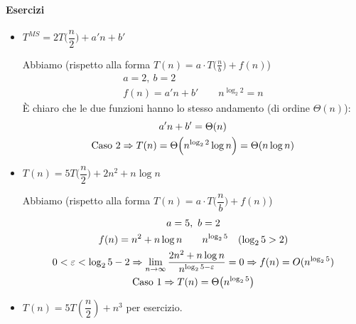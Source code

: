 \paragraph{Esercizi}
\begin{itemize}[label=$\bullet$]
    \item $T^{MS} = 2T\big(\dfrac{n}{2}\big) + a'n + b'$ \par
    Abbiamo (rispetto alla forma $T(n) = a \cdot T\big(\frac{n}{b}\big) + f(n)$)
    \begin{gather*}
        a = 2, \ b = 2 \\
        f(n) = a'n + b' \qquad n^{\log_2 2} = n
    \end{gather*}
    È chiaro che le due funzioni hanno lo stesso andamento (di ordine $\Theta(n)$):
    \begin{gather*}
        a'n + b' = \Theta (n) \\
        \text{\emph{Caso 2}} \Rightarrow T(n) = \Theta \Big(n^{\log_2 2} \log n \Big) = \Theta (n \log n)
    \end{gather*}

    \item $T(n) = 5T\big( \dfrac{n}{2} \big) + 2n^2 + n \log n$ \par
    Abbiamo (rispetto alla forma $T(n) = a \cdot T\big(\dfrac{n}{b}\big) + f(n)$)
    \begin{gather*}
        a = 5, \ b = 2 \\
        f(n) = n^2 + n \log n \qquad n^{\log_2 5} \quad (\log_2 5 > 2) \\
        0 < \varepsilon < \log_2 5 - 2 \Rightarrow 
            \lim_{n \to \infty} \frac{2n^2 + n \log n}{n^{\log_2 5 - \varepsilon}} = 0 
            \Rightarrow f(n) = O(n^{\log_2 5}) \\
        \text{\emph{Caso 1}} \Rightarrow T(n) = \Theta \big( n^{\log_2 5} \big)
    \end{gather*}

    \item $T(n) = 5T(\dfrac{n}{2}) + n^3$ per esercizio.


\end{itemize}
